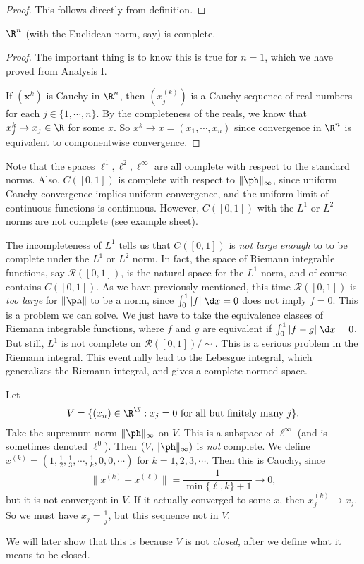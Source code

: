 \documentclass[a4paper]{article}
\begin{document}
\begin{proof}
  This follows directly from definition.
\end{proof}

\begin{thm}[]
  $\R^n$ (with the Euclidean norm, say) is complete.
\end{thm}

\begin{proof}
  The important thing is to know this is true for $n = 1$, which we have proved from Analysis I.

  If $(\mathbf{x}^k)$ is Cauchy in $\R^n$, then $(x_j^{(k)})$ is a Cauchy sequence of real numbers for each $j \in \{1, \cdots, n\}$. By the completeness of the reals,  we know that $x_j^k \to x_j \in \R$ for some $x$. So $x^k \to x = (x_1, \cdots, x_n)$ since convergence in $\R^n$ is equivalent to componentwise convergence.
\end{proof}
Note that the spaces $\ell^1, \ell^2, \ell^\infty$ are all complete with respect to the standard norms. Also, $C([0, 1])$ is complete with respect to $\|\ph\|_\infty$, since uniform Cauchy convergence implies uniform convergence, and the uniform limit of continuous functions is continuous. However, $C([0, 1])$ with the $L^1$ or $L^2$ norms are not complete (see example sheet).

The incompleteness of $L^1$ tells us that $C([0, 1])$ is \emph{not large enough} to to be complete under the $L^1$ or $L^2$ norm. In fact, the space of Riemann integrable functions, say $\mathcal{R}([0, 1])$, is the natural space for the $L^1$ norm, and of course contains $C([0, 1])$. As we have previously mentioned, this time $\mathcal{R}([0, 1])$ is \emph{too large} for $\|\ph\|$ to be a norm, since $\int_0^1 |f|\;\d x = 0$ does not imply $f = 0$. This is a problem we can solve. We just have to take the equivalence classes of Riemann integrable functions, where $f$ and $g$ are equivalent if $\int_0^1 |f - g|\;\d x = 0$. But still, $L^1$ is not complete on $\mathcal{R}([0, 1])/{\sim}$. This is a serious problem in the Riemann integral. This eventually lead to the Lebesgue integral, which generalizes the Riemann integral, and gives a complete normed space.

\begin{eg}
  Let
  \[
    V = \{(x_n) \in \R^\N: x_j = 0\text{ for all but finitely many }j\}.
  \]
  Take the supremum norm $\|\ph\|_\infty$ on $V$. This is a subspace of $\ell^\infty$ (and is sometimes denoted $\ell^0$). Then $(V, \|\ph\|_\infty)$ is \emph{not} complete. We define $x^{(k)} = (1, \frac{1}{2}, \frac{1}{3}, \cdots, \frac{1}{k}, 0, 0, \cdots)$ for $k = 1, 2, 3, \cdots$. Then this is Cauchy, since
  \[
    \|x^{(k)} - x^{(\ell)}\| = \frac{1}{\min\{\ell, k\} + 1} \to 0,
  \]
  but it is not convergent in $V$. If it actually converged to some $x$, then $x^{(k)}_j \to x_j$. So we must have $x_j = \frac{1}{j}$, but this sequence not in $V$.

  We will later show that this is because $V$ is not \emph{closed}, after we define what it means to be closed.
\end{eg}
\end{document}
